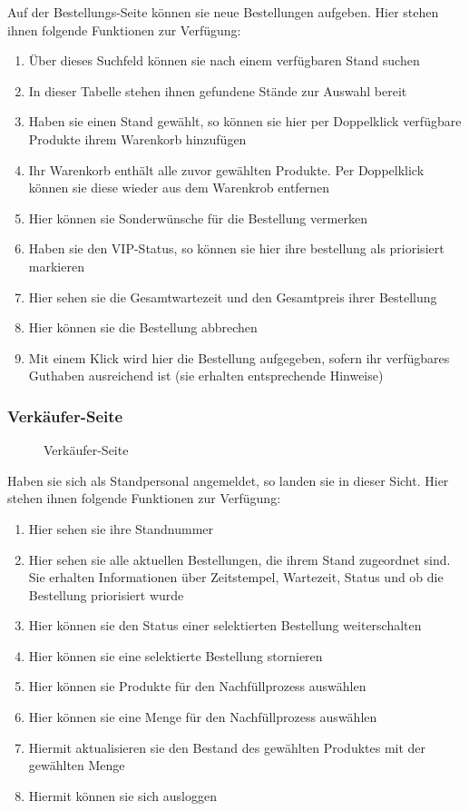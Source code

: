 Auf der Bestellungs-Seite können sie neue Bestellungen aufgeben. Hier stehen ihnen folgende Funktionen zur Verfügung:
\begin{enumerate}
    \item Über dieses Suchfeld können sie nach einem verfügbaren Stand suchen
    \item In dieser Tabelle stehen ihnen gefundene Stände zur Auswahl bereit
    \item Haben sie einen Stand gewählt, so können sie hier per Doppelklick verfügbare Produkte ihrem Warenkorb hinzufügen
    \item Ihr Warenkorb enthält alle zuvor gewählten Produkte. Per Doppelklick können sie diese wieder aus dem Warenkrob entfernen
    \item Hier können sie Sonderwünsche für die Bestellung vermerken
    \item Haben sie den VIP-Status, so können sie hier ihre bestellung als priorisiert markieren
    \item Hier sehen sie die Gesamtwartezeit und den Gesamtpreis ihrer Bestellung
    \item Hier können sie die Bestellung abbrechen
    \item Mit einem Klick wird hier die Bestellung aufgegeben, sofern ihr verfügbares Guthaben ausreichend ist (sie erhalten entsprechende Hinweise)
\end{enumerate}

\subsubsection{Verkäufer-Seite}
\label{app:BenutzerhandbuchVerkäuferSeite}

\begin{figure}[htb]
\centering
{}
\caption{Verkäufer-Seite}
\end{figure}

Haben sie sich als Standpersonal angemeldet, so landen sie in dieser Sicht. Hier stehen ihnen folgende Funktionen zur Verfügung:
\begin{enumerate}
    \item Hier sehen sie ihre Standnummer
    \item Hier sehen sie alle aktuellen Bestellungen, die ihrem Stand zugeordnet sind. Sie erhalten Informationen über Zeitstempel, Wartezeit, Status und ob die Bestellung
    priorisiert wurde
    \item Hier können sie den Status einer selektierten Bestellung weiterschalten
    \item Hier können sie eine selektierte Bestellung stornieren
    \item Hier können sie Produkte für den Nachfüllprozess auswählen
    \item Hier können sie eine Menge für den Nachfüllprozess auswählen
    \item Hiermit aktualisieren sie den Bestand des gewählten Produktes mit der gewählten Menge
    \item Hiermit können sie sich ausloggen
\end{enumerate}
